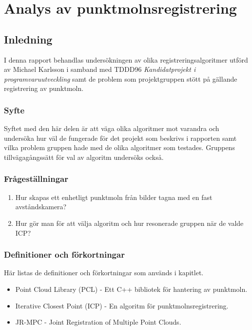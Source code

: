 \chapter{Analys av punktmolnsregistrering}
\label{cha:indiv-report-karlsson}


\section{Inledning}
\label{sec:introduction-karlsson}

I denna rapport behandlas undersökningen av olika registreringsalgoritmer utförd av Michael Karlsson i samband med TDDD96 \textit{Kandidatprojekt i programvaruutveckling} samt de problem som projektgruppen stött på gällande registrering av punktmoln.

\subsection{Syfte}
\label{sec:purpose-karlsson}

Syftet med den här delen är att väga olika algoritmer mot varandra och undersöka hur väl de fungerade för det projekt som beskrivs i rapporten samt vilka problem gruppen hade med de olika algoritmer som testades. Gruppens tillvägagångssätt för val av algoritm undersöks också.


\subsection{Frågeställningar}
\label{sec:issue-karlsson}

\begin{enumerate}
	\item Hur skapas ett enhetligt punktmoln från bilder tagna med en fast avståndskamera?
	\item Hur gör man för att välja algoritm och hur resonerade gruppen när de valde ICP?	
\end{enumerate}

\subsection{Definitioner och förkortningar}
\label{sec:definitions-acronyms-karlsson}

Här listas de definitioner och förkortningar som används i kapitlet.

\begin{itemize}
	\item Point Cloud Library (PCL) \cite{pcl_home} - Ett C++ bibliotek för hantering av punktmoln.
	\item Iterative Closest Point (ICP) - En algoritm för punktmolnsregistrering.
	\item JR-MPC \cite{Evangelidis-ECCV-2014} - Joint Registration of Multiple Point Clouds.
\end{itemize}



